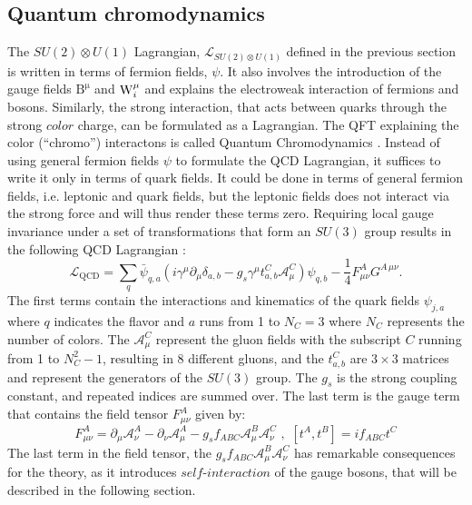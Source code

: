 \subsection*{Quantum chromodynamics} 
\noindent\justify
The $SU(2)\otimes U(1)$ Lagrangian, $\mathcal{L}_{SU(2)\otimes U(1)}$ defined in the previous section is written in terms of fermion fields, $\psi$. 
It also involves the introduction of the gauge fields $\mathrm{B^{\mu}}$ and $\mathrm{W}_{i}^{\mu}$ and explains the electroweak interaction of fermions and bosons.  
Similarly, the strong interaction, that acts between quarks through the strong $color$ charge, can be formulated as a Lagrangian. 
The QFT explaining the color (``chromo'') interactons is called Quantum Chromodynamics \cite{Han:1965pf,GellMann:1962xb,Greenberg:1964pe}. 
Instead of using general fermion fields $\psi$ to formulate the QCD Lagrangian, it suffices to write it only in terms of quark fields. 
It could be done in terms of general fermion fields, i.e. leptonic and quark fields, but the leptonic fields does not interact via the strong force and will thus render these terms zero.
Requiring local gauge invariance under a set of transformations that form an $SU(3)$ group results in the following QCD Lagrangian \cite{PhysRevD.98.030001}:
\begin{equation}  
\mathcal{L}_{\mathrm{QCD}}=\sum_{q}\bar{\psi}_{q,a}(i\gamma^{\mu}\partial_{\mu}\delta_{a,b}-g_{s}\gamma^{\mu}t_{a,b}^{C}\mathcal{A}_{\mu}^{C})\psi_{q,b}-\frac{1}{4}F_{\mu\nu}^{A}G^{A\,\mu\nu}.
\end{equation} 
The first terms contain the interactions and kinematics of the quark fields $\psi_{j,a}$ where $q$ indicates the flavor and $a$ runs from 1 to $N_{C}=3$ where $N_{C}$ represents the number of colors.
The $\mathcal{A}_{\mu}^{C}$ represent the gluon fields with the subscript $C$ running from 1 to $N_{C}^{2}-1$, resulting in 8 different gluons, and the $t_{a,b}^{C}$ are $3\times3$ matrices and represent the generators of the $SU(3)$ group.
The $g_{s}$ is the strong coupling constant, and repeated indices are summed over.
The last term is the gauge term that contains the field tensor $F_{\mu\nu}^{A}$ given by:
\begin{equation}  
F_{\mu\nu}^{A}=\partial_{\mu}\mathcal{A}_{\nu}^{A}-\partial_{\nu}\mathcal{A}_{\mu}^{A}-g_{s}f_{ABC}\mathcal{A}_{\mu}^{B}\mathcal{A}_{\nu}^{C}\,\, , \,\, [t^{A},t^{B}]=i f_{ABC}t^{C} 
\label{eq:fst}
\end{equation}  
The last term in the field tensor, the $g_{s}f_{ABC}\mathcal{A}_{\mu}^{B}\mathcal{A}_{\nu}^{C}$ has remarkable consequences for the theory, as it introduces $self$-$interaction$ of the gauge bosons, that will be described in the following section.
